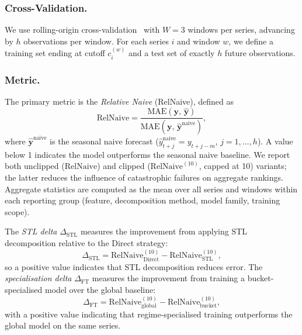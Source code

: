 \documentclass[pdflatex,sn-mathphys-num]{sn-jnl}
\theoremstyle{thmstyleone}
\theoremstyle{thmstyletwo}
\theoremstyle{thmstylethree}
\begin{document}
\subsubsection{Cross-Validation.}
We use rolling-origin cross-validation~\cite{tashman2000} with $W = 3$ windows
per series, advancing by $h$ observations per window.
For each series $i$ and window $w$, we define a training set ending at cutoff
$c_i^{(w)}$ and a test set of exactly $h$ future observations.

\subsubsection{Metric.}
The primary metric is the \emph{Relative Naive} (RelNaive), defined as
\begin{equation}
  \mathrm{RelNaive} =
    \frac{\mathrm{MAE}(\mathbf{y},\,\hat{\mathbf{y}})}
         {\mathrm{MAE}(\mathbf{y},\,\hat{\mathbf{y}}^{\mathrm{naive}})},
  \label{eq:relnai}
\end{equation}
where $\hat{\mathbf{y}}^{\mathrm{naive}}$ is the seasonal naive forecast
($\hat{y}_{t+j}^{\mathrm{naive}} = y_{t+j-m}$, $j = 1, \ldots, h$).
A value below 1 indicates the model outperforms the seasonal naive baseline.
We report both unclipped ($\mathrm{RelNaive}$) and clipped
($\mathrm{RelNaive}^{(10)}$, capped at 10) variants; the latter reduces the
influence of catastrophic failures on aggregate rankings.
Aggregate statistics are computed as the mean over all series and windows within
each reporting group (feature, decomposition method, model family, training scope).

The \emph{STL delta} $\Delta_{\mathrm{STL}}$ measures the improvement from
applying STL decomposition relative to the Direct strategy:
\begin{equation}
  \Delta_{\mathrm{STL}} =
    \mathrm{RelNaive}^{(10)}_{\mathrm{Direct}} -
    \mathrm{RelNaive}^{(10)}_{\mathrm{STL}},
  \label{eq:stl_delta}
\end{equation}
so a positive value indicates that STL decomposition reduces error.
The \emph{specialisation delta} $\Delta_{\mathrm{FT}}$ measures the improvement
from training a bucket-specialised model over the global baseline:
\begin{equation}
  \Delta_{\mathrm{FT}} =
    \mathrm{RelNaive}^{(10)}_{\mathrm{global}} -
    \mathrm{RelNaive}^{(10)}_{\mathrm{bucket}},
  \label{eq:ft_delta}
\end{equation}
with a positive value indicating that regime-specialised training outperforms
the global model on the same series.
\end{document}
